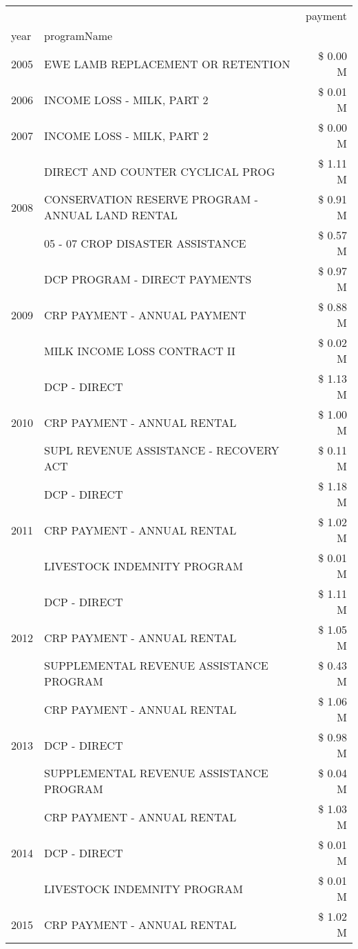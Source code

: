 \begin{tabular}{llr}
\toprule
 &  & payment \\
year & programName &  \\
\midrule
2005 & EWE LAMB REPLACEMENT OR RETENTION & \$ 0.00 M \\
\cline{1-3}
2006 & INCOME LOSS - MILK, PART 2 & \$ 0.01 M \\
\cline{1-3}
2007 & INCOME LOSS - MILK, PART 2 & \$ 0.00 M \\
\cline{1-3}
\multirow[t]{3}{*}{2008} & DIRECT AND COUNTER CYCLICAL PROG & \$ 1.11 M \\
 & CONSERVATION RESERVE PROGRAM - ANNUAL LAND RENTAL & \$ 0.91 M \\
 & 05 - 07 CROP DISASTER ASSISTANCE & \$ 0.57 M \\
\cline{1-3}
\multirow[t]{3}{*}{2009} & DCP PROGRAM - DIRECT PAYMENTS & \$ 0.97 M \\
 & CRP PAYMENT - ANNUAL PAYMENT & \$ 0.88 M \\
 & MILK INCOME LOSS CONTRACT II & \$ 0.02 M \\
\cline{1-3}
\multirow[t]{3}{*}{2010} & DCP - DIRECT & \$ 1.13 M \\
 & CRP PAYMENT - ANNUAL RENTAL & \$ 1.00 M \\
 & SUPL REVENUE ASSISTANCE - RECOVERY ACT & \$ 0.11 M \\
\cline{1-3}
\multirow[t]{3}{*}{2011} & DCP - DIRECT & \$ 1.18 M \\
 & CRP PAYMENT - ANNUAL RENTAL & \$ 1.02 M \\
 & LIVESTOCK INDEMNITY PROGRAM & \$ 0.01 M \\
\cline{1-3}
\multirow[t]{3}{*}{2012} & DCP - DIRECT & \$ 1.11 M \\
 & CRP PAYMENT - ANNUAL RENTAL & \$ 1.05 M \\
 & SUPPLEMENTAL REVENUE ASSISTANCE PROGRAM & \$ 0.43 M \\
\cline{1-3}
\multirow[t]{3}{*}{2013} & CRP PAYMENT - ANNUAL RENTAL & \$ 1.06 M \\
 & DCP - DIRECT & \$ 0.98 M \\
 & SUPPLEMENTAL REVENUE ASSISTANCE PROGRAM & \$ 0.04 M \\
\cline{1-3}
\multirow[t]{3}{*}{2014} & CRP PAYMENT - ANNUAL RENTAL & \$ 1.03 M \\
 & DCP - DIRECT & \$ 0.01 M \\
 & LIVESTOCK INDEMNITY PROGRAM & \$ 0.01 M \\
\cline{1-3}
\multirow[t]{3}{*}{2015} & CRP PAYMENT - ANNUAL RENTAL & \$ 1.02 M \\

\end{tabular}
